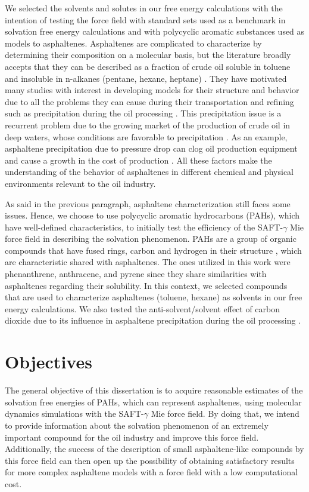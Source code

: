 We selected the solvents and solutes in our free energy calculations with the intention of testing the force field with standard sets used as a benchmark in solvation free energy calculations and with polycyclic aromatic substances used as models to asphaltenes. Asphaltenes are complicated to characterize by determining their composition on a molecular basis, but the literature broadly accepts that they can be described as a fraction of crude oil soluble in toluene and insoluble in n-alkanes (pentane, hexane, heptane) \cite{SJOBLOM2003399}. They have motivated many studies with interest in developing models for their structure and behavior due to all the problems they can cause during their transportation and refining such as precipitation during the oil processing \cite{SJOBLOM20151}. This precipitation issue is a recurrent problem due to the growing market of the production of crude oil in deep waters, whose conditions are favorable to precipitation \cite{AIC:AIC10243}. As an example, asphaltene precipitation due to pressure drop can clog oil production equipment and cause a growth in the cost of production \cite{doi:10.1021/ef010047l}. All these factors make the understanding of the behavior of asphaltenes in different chemical and physical environments relevant to the oil industry. 

As said in the previous paragraph, asphaltene characterization still faces some issues. Hence, we choose to use polycyclic aromatic hydrocarbons (PAHs), which have well-defined characteristics, to initially test the efficiency of the SAFT-$\gamma$ Mie force field in describing the solvation phenomenon. PAHs are a group of organic compounds that have fused rings, carbon and hydrogen in their structure \cite{RAVINDRA20082895}, which are characteristic shared with asphaltenes. The ones utilized in this work were phenanthrene, anthracene, and pyrene since they share similarities with asphaltenes regarding their solubility. In this context,  we selected compounds that are used to characterize asphaltenes (toluene, hexane) as solvents in our free energy calculations. We also tested the anti-solvent/solvent effect of carbon dioxide due to its influence in asphaltene precipitation during the oil processing \cite{SOROUSH2014405}.

\chapter{Objectives} %

The general objective of this dissertation is to acquire reasonable estimates of the solvation free energies of PAHs, which can represent asphaltenes, using molecular dynamics simulations with the SAFT-$\gamma$ Mie force field. By doing that, we intend to provide information about the solvation phenomenon of an extremely important compound for the oil industry and improve this force field. Additionally, the success of the description of small asphaltene-like compounds by this force field can then open up the possibility of obtaining satisfactory results for more complex asphaltene models with a force field with a low computational cost.

